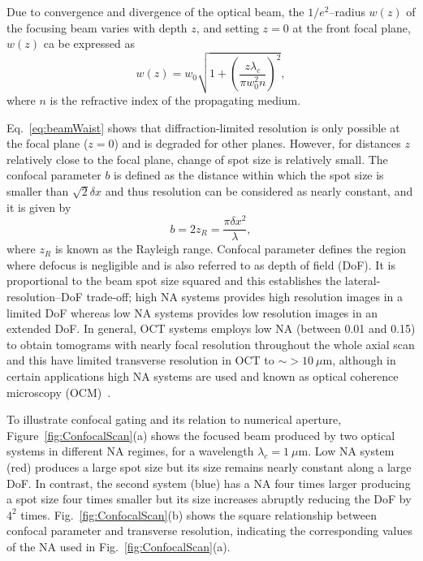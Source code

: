 Due to convergence and divergence of the optical beam, the $1/e^2$--radius $w(z)$  of the focusing beam varies with depth $z$, and setting $z=0$ at the front focal plane, $w(z)$ ca be expressed as~\cite{Ralston2005_Deconvolution}
\begin{equation}\label{eq:beamWaist}
    w(z) = w_0 \sqrt{1 + \left(\frac{z\lambda_c}{\pi w_0^2n}\right)^2},
\end{equation}
where $n$ is the refractive index of the propagating medium.

Eq.~\ref{eq:beamWaist} shows that diffraction-limited resolution is only possible at the focal plane ($z=0$) and is degraded for other planes. However, for distances $z$ relatively close to the focal plane, change of spot size is relatively small. The confocal parameter $b$ is defined as the distance within which the spot size is smaller than $\sqrt{2}\delta x$ and thus resolution can be considered as nearly constant, and it is given by~\cite{Ralston2005_Deconvolution}
\begin{equation}
    b = 2z_R = \frac{\pi\delta x^2}{\lambda},
\end{equation}
where $z_R$ is known as the Rayleigh range. Confocal parameter defines the region where defocus is negligible and is also referred to as depth of field (DoF). It is proportional to the beam spot size squared and this establishes the lateral-resolution--DoF trade-off; high NA systems provides high resolution images in a limited DoF whereas low NA systems provides low resolution images in an extended DoF. In general, OCT systems employs low NA (between 0.01 and 0.15) to obtain tomograms with nearly focal resolution throughout the whole axial scan and this have limited transverse resolution in OCT to $\sim>10~\mu$m, although in certain applications high NA systems are used and known as optical coherence microscopy (OCM)~\cite{Fujimoto2015_Introduction}.

To illustrate confocal gating and its relation to numerical aperture, Figure~\ref{fig:ConfocalScan}(a) shows the focused beam produced by two optical systems in different NA regimes, for a wavelength $\lambda_c = 1~\mu$m. Low NA system (red) produces a large spot size but its size remains nearly constant along a large DoF. In contrast, the second system (blue) has a NA four times larger producing a spot size four times smaller but its size increases abruptly reducing the DoF by $4^2$ times. Fig.~\ref{fig:ConfocalScan}(b) shows the square relationship between confocal parameter and transverse resolution, indicating the corresponding values of the NA used in Fig.~\ref{fig:ConfocalScan}(a).

